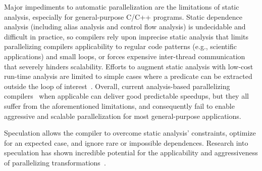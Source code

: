 Major impediments to automatic parallelization are the limitations of static
analysis, especially for general-purpose C/C++ programs. Static dependence
analysis (including alias analysis and control flow analysis) is undecidable and
difficult in practice, so compilers rely upon imprecise static analysis that
limits parallelizing compilers applicability to regular code patterns (e.g.,
scientific applications) and small loops, or forces expensive inter-thread
communication that severely hinders scalability.
%
%
Efforts to augment static analysis with low-cost run-time analysis are limited
to simple cases where a predicate can be extracted outside the loop of
interest~\cite{hybrid_analysis, suif:94:stanford, polaris}.
%
Overall, current analysis-based parallelizing
compilers~\cite{campanoni:2012:iscgo, raman:2008:iscgo, suif:94:stanford,
polaris, sensitivity} when applicable can deliver good predictable speedups, but
they all suffer from the aforementioned limitations, and consequently fail to
enable aggressive and scalable parallelization for most general-purpose
applications.

Speculation allows the compiler to overcome static analysis' constraints,
optimize for an expected
case, and ignore rare or impossible dependences.  Research into speculation has
shown incredible potential for the applicability and aggressiveness of
parallelizing transformations~\cite{zhong:08:hpca, johnson:12:pldi:short}.
%

